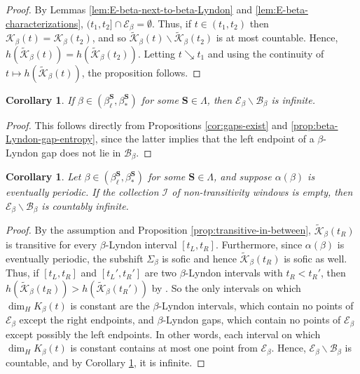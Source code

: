 \documentclass[11pt]{amsart}
\newtheorem{corollary}[theorem]{Corollary}
\theoremstyle{definition}
\theoremstyle{remark}
\numberwithin{equation}{section}
\newcommand{\BB}{\mathscr{B}}
\newcommand{\EE}{\mathscr{E}}
\newcommand{\II}{\mathcal{I}}
\newcommand{\Kt}{\widetilde{\mathcal{K}}}
\newcommand{\cs}{ {\mathbf{S}}}
\newcommand{\al}{\alpha}
\newcommand{\La}{\Lambda}
\begin{document}
\begin{proof}
By Lemmas \ref{lem:E-beta-next-to-beta-Lyndon} and \ref{lem:E-beta-characterizations}, $(t_1,t_2]\cap\EE_\beta=\emptyset$. Thus, if $t\in(t_1,t_2)$ then $\mathcal{K}_\beta(t)=\mathcal{K}_\beta(t_2)$, and so $\Kt_\beta(t)\backslash \Kt_\beta(t_2)$ is at most countable. Hence, $h(\Kt_\beta(t))=h(\Kt_\beta(t_2))$. Letting $t\searrow t_1$ and using the continuity of $t\mapsto h(\Kt_\beta(t))$, the proposition follows.
\end{proof}

\begin{corollary} \label{cor:infinite-bifurcation-difference}
If $\beta\in(\beta_\ell^{\cs},\beta_*^{\cs})$ for some $\cs\in\La$, then $\EE_\beta\backslash\BB_\beta$ is infinite.
\end{corollary}

\begin{proof}
This follows directly from Propositions \ref{cor:gaps-exist} and \ref{prop:beta-Lyndon-gap-entropy}, since the latter implies that the left endpoint of a $\beta$-Lyndon gap does not lie in $\BB_\beta$.
\end{proof}

\begin{corollary} \label{cor:countably-infinite}
Let $\beta\in(\beta_\ell^{\cs},\beta_*^{\cs})$ for some $\cs\in\La$, and suppose $\al(\beta)$ is eventually periodic. If the collection $\II$ of non-transitivity windows is empty, then $\EE_\beta\backslash\BB_\beta$ is countably infinite.
\end{corollary}

\begin{proof}
By the assumption and Proposition \ref{prop:transitive-in-between}, $\Kt_\beta(t_R)$ is transitive for every $\beta$-Lyndon interval $[t_L,t_R]$. Furthermore, since $\al(\beta)$ is eventually periodic, the subshift $\Sigma_\beta$ is sofic and hence $\Kt_\beta(t_R)$ is sofic as well. Thus, if $[t_L,t_R]$ and $[t_L',t_R']$ are two $\beta$-Lyndon intervals with $t_R<t_R'$, then $h(\Kt_\beta(t_R))>h(\Kt_\beta(t_R'))$ by \cite[Corollary 4.4.9]{Lind_Marcus_1995}. So the only intervals on which $\dim_H K_\beta(t)$ is constant are the $\beta$-Lyndon intervals, which contain no points of $\EE_\beta$ except the right endpoints, and $\beta$-Lyndon gaps, which contain no points of $\EE_\beta$ except possibly the left endpoints. In other words, each interval on which $\dim_H K_\beta(t)$ is constant contains at most one point from $\EE_\beta$. Hence, $\EE_\beta\backslash\BB_\beta$ is countable, and by Corollary \ref{cor:infinite-bifurcation-difference}, it is infinite.
\end{proof}
\end{document}
